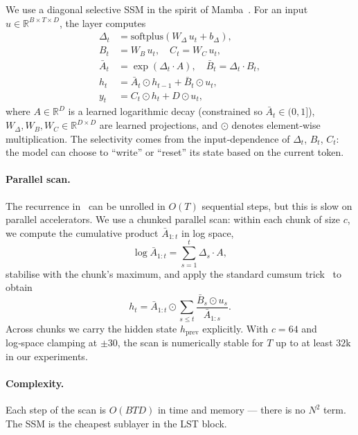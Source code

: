 \documentclass[10pt,twocolumn,letterpaper]{article}
\newcommand{\LST}{\textsc{LST}}
\begin{document}
We use a diagonal selective SSM in the spirit of Mamba~\cite{gu2023mamba}.  For an input $u\in\mathbb{R}^{B\times T\times D}$, the layer computes
\begin{align}
    \Delta_t &= \mathrm{softplus}(W_\Delta\, u_t + b_\Delta), \label{eq:delta}\\
    B_t &= W_B\, u_t, \quad C_t = W_C\, u_t, \label{eq:bc}\\
    \bar A_t &= \exp(\Delta_t \cdot A), \quad \bar B_t = \Delta_t \cdot B_t, \label{eq:disc}\\
    h_t &= \bar A_t \odot h_{t-1} + \bar B_t \odot u_t, \label{eq:state}\\
    y_t &= C_t \odot h_t + D \odot u_t, \label{eq:out}
\end{align}
where $A\in\mathbb{R}^D$ is a learned logarithmic decay (constrained so $\bar A_t\in(0,1]$), $W_\Delta, W_B, W_C\in\mathbb{R}^{D\times D}$ are learned projections, and $\odot$ denotes element‑wise multiplication.  The selectivity comes from the input‑dependence of $\Delta_t$, $B_t$, $C_t$: the model can choose to ``write'' or ``reset'' its state based on the current token.

\paragraph{Parallel scan.}  The recurrence in~ can be unrolled in $O(T)$ sequential steps, but this is slow on parallel accelerators.  We use a chunked parallel scan: within each chunk of size $c$, we compute the cumulative product $\bar A_{1:t}$ in log space,
\begin{equation}
    \log \bar A_{1:t} = \sum_{s=1}^{t} \Delta_s \cdot A,
\end{equation}
stabilise with the chunk's maximum, and apply the standard cumsum trick~\cite{gu2023mamba} to obtain
\begin{equation}
    h_t = \bar A_{1:t} \odot \sum_{s\le t} \frac{\bar B_s \odot u_s}{\bar A_{1:s}}.
    \label{eq:parallel}
\end{equation}
Across chunks we carry the hidden state $h_{\text{prev}}$ explicitly.  With $c\!=\!64$ and log‑space clamping at $\pm 30$, the scan is numerically stable for $T$ up to at least $32\text{k}$ in our experiments.

\paragraph{Complexity.}  Each step of the scan is $O(BTD)$ in time and memory — there is no $N^2$ term.  The SSM is the cheapest sublayer in the \LST{} block.
\end{document}
